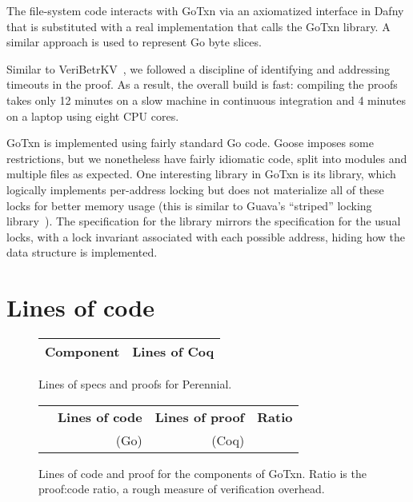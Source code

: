 The file-system code interacts with GoTxn via an axiomatized interface in Dafny
that is substituted with a real implementation that calls the GoTxn library. A
similar approach is used to represent Go byte slices.

Similar to VeriBetrKV~\cite{hance:veribetrkv}, we followed a
discipline of identifying and addressing timeouts in the proof.
As a result, the overall
build is fast: compiling the proofs takes only 12 minutes on a slow
machine in continuous integration and 4 minutes on a laptop
using eight CPU cores.


GoTxn is implemented using fairly standard Go code. Goose imposes some
restrictions, but we nonetheless have fairly idiomatic code, split into modules
and multiple files as expected. One interesting library in GoTxn is its
 library, which logically implements per-address locking but does
not materialize all of these locks for better memory usage (this is similar to
Guava's ``striped'' locking library~\cite{guava-striped}). The specification for
the library mirrors the specification for the usual locks, with a lock invariant
associated with each possible address, hiding how the data structure is
implemented.

\section{Lines of code}


\begin{figure}
\centering
\small
\begin{tabular}{lr}
\toprule
\bf Component & \bf Lines of Coq \\
\midrule
  
\end{tabular}
\caption{Lines of specs and proofs for Perennial.}
\label{fig:perennial:lines}
\end{figure}

\begin{figure}
\centering
\begin{tabular}{lrrr}
\toprule
  & \bf Lines of code & \bf Lines of proof & \bf Ratio \\
  & (Go) & (Coq) & \\
\midrule
  
\end{tabular}
\caption{Lines of code and proof for the components of GoTxn.
Ratio is the proof:code ratio, a rough measure of verification overhead.}
\label{fig:txn:loc}
\end{figure}



